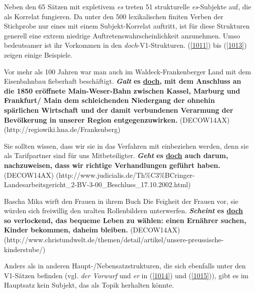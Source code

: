 {Neben den 65 Sätzen mit expletivem \textit{es} treten 51 strukturelle \textit{es}-Subjekte auf, die als Korrelat  fungieren. Da unter den 500 lexikalischen finiten Verben der Stichprobe nur eines mit einem Subjekt-Korrelat auftritt, ist für diese Strukturen generell eine extrem niedrige Auftretenswahrscheinlichkeit anzunehmen. Umso bedeutsamer ist ihr Vorkommen in den \textit{doch}-V1-Strukturen. (\ref{1011}) bis (\ref{1013}) zeigen einige Beispiele.
	
\begin{exe}
	\ex\label{1011} 
	\scriptsize
	Vor mehr als 100 Jahren war man auch im Waldeck-Frankenberger Land mit dem Eisenbahnbau fieberhaft beschäftigt. \textbf{\textit{Galt} es 					\underline{doch}, mit dem Anschluss an die 1850 eröffnete Main-Weser-Bahn zwi\-schen Kassel, Marburg und Frankfurt/ Main dem schleichenden Niedergang der 	ohnehin spärlichen Wirtschaft und der damit verbundenen Verarmung der Bevölkerung in unserer Region entgegenzuwirken.  	}	  		
	\hfill\hbox {(DECOW14AX)}
	\newline
	\hbox{}\hfill\hbox{(http://regiowiki.hna.de/Frankenberg)}
\end{exe}	
	
\begin{exe}
	\ex\label{1012} 
	\scriptsize
	Sie sollten wissen, dass wir sie in das Verfahren mit einbeziehen werden, denn sie als Tarifpartner sind für uns Mitbeteiligter. \textbf{\textit{Geht} 		es \underline{doch} auch darum, nachzuweisen, dass wir richtige Verhandlungen geführt haben.  }	  		
	\hfill\hbox {(DECOW14AX)}
	\newline
	\hbox{}\hfill\hbox{(http://www.judicialis.de/Th\%C3\%BCringer-}
	\newline
	\hbox{}\hfill\hbox{Landesarbeitsgericht\_2-BV-3-00\_Beschluss\_17.10.2002.html)}
\end{exe}	
										           
\begin{exe}
	\ex\label{1013} 
	\scriptsize
	Bascha Mika wirft den Frauen in ihrem Buch \glqq Die Feigheit der Frauen\grqq{} vor, sie würden sich freiwillig den uralten Rollenbildern unterwerfen. 		\textbf{\textit{Scheint} es \underline{doch} so verlockend, das bequeme Leben zu wählen: einen Ernährer suchen, Kinder bekommen, daheim bleiben.} 		
	\hfill\hbox {(DECOW14AX)}
	\newline
	\hbox{}\hfill\hbox{(http://www.christundwelt.de/themen/detail/artikel/unsere-preussische-kinderstube/)}
\end{exe}	
Anders als in anderen Haupt-/Nebensatzstrukturen, die sich ebenfalls unter den V1-Sätzen befinden (vgl. \textit{der Vorwurf} und \textit{er} in (\ref{1014}) und (\ref{1015})), gibt es im Hauptsatz kein Subjekt, das als Topik herhalten könnte. 

}
